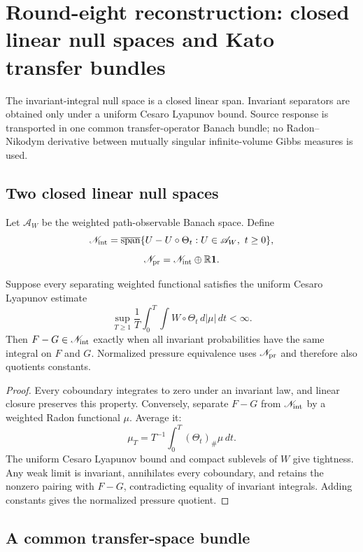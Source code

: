 \section{Round-eight reconstruction: closed linear null spaces and Kato transfer bundles}
\label{sec:r8-c2}

The invariant-integral null space is a closed linear span.  Invariant
separators are obtained only under a uniform Cesaro Lyapunov bound.  Source
response is transported in one common transfer-operator Banach bundle; no
Radon--Nikodym derivative between mutually singular infinite-volume Gibbs
measures is used.

\subsection{Two closed linear null spaces}

Let $\mathscr A_W$ be the weighted path-observable Banach space.  Define
\[
 \mathscr N_{\rm int}
 =\overline{\operatorname{span}}
 \{U-U\circ\Theta_t:U\in\mathscr A_W,\ t\ge0\},
\]
\[
 \mathscr N_{\rm pr}=\mathscr N_{\rm int}\oplus\mathbb R\mathbf1.
\]

\begin{theorem}
\label{thm:r8-c2-null}
Suppose every separating weighted functional satisfies the uniform Cesaro
Lyapunov estimate
\[
 \sup_{T\ge1}\frac1T\int_0^T
 \int W\circ\Theta_t\,d|\mu|\,dt<\infty.
\]
Then $F-G\in\mathscr N_{\rm int}$ exactly when all invariant probabilities have
the same integral on $F$ and $G$.  Normalized pressure equivalence uses
$\mathscr N_{\rm pr}$ and therefore also quotients constants.
\end{theorem}

\begin{proof}
Every coboundary integrates to zero under an invariant law, and linear closure
preserves this property.  Conversely, separate $F-G$ from
$\mathscr N_{\rm int}$ by a weighted Radon functional $\mu$.  Average it:
\[
 \mu_T=T^{-1}\int_0^T(\Theta_t)_\#\mu\,dt.
\]
The uniform Cesaro Lyapunov bound and compact sublevels of $W$ give tightness.
Any weak limit is invariant, annihilates every coboundary, and retains the
nonzero pairing with $F-G$, contradicting equality of invariant integrals.
Adding constants gives the normalized pressure quotient.
\end{proof}

\subsection{A common transfer-space bundle}

